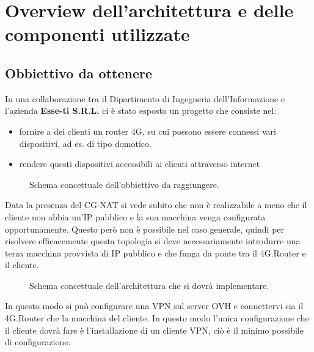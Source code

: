 

\chapter{Overview dell'architettura e delle componenti utilizzate}

\label{ch:overview}

\section{Obbiettivo da ottenere}

In una collaborazione tra il Dipartimento di Ingegneria dell'Informazione e l'azienda \textbf{Esse-ti S.R.L.} ci \`e stato esposto un progetto che consiste nel:

\begin{itemize}
	\item fornire a dei clienti un router 4G, su cui possono essere connessi vari dispositivi, ad es. di tipo domotico.
	\item rendere questi dispositivi accessibili ai clienti attraverso internet
\end{itemize}

\begin{figure}[ht]
	\centering
	
	\caption{Schema concettuale dell'obbiettivo da raggiungere. \cite{icons}}

	\label{fig:schema_concettuale}

\end{figure}

Data la presenza del CG-NAT si vede subito che non \`e realizzabile a meno che il cliente non abbia un'IP pubblico e la sua macchina venga configurata opportunamente. Questo per\`o non \`e possibile nel caso generale, quindi per risolvere efficacemente questa topologia si deve necessariamente introdurre una terza macchina provvista di IP pubblico e che funga da ponte tra il 4G.Router e il cliente.


\begin{figure}[ht]
	\centering
	
	\caption{Schema concettuale dell'architettura che si dovr\`a implementare. \cite{icons}}

	\label{fig:schem_architettura_reale}

\end{figure}

In questo modo si pu\`o configurare una VPN sul server OVH e connettervi sia il 4G.Router che la macchina del cliente. In questo modo l'unica configurazione che il cliente dovr\`a fare \`e l'installazione di un cliente VPN, ci\`o \`e il minimo possibile di configurazione.

